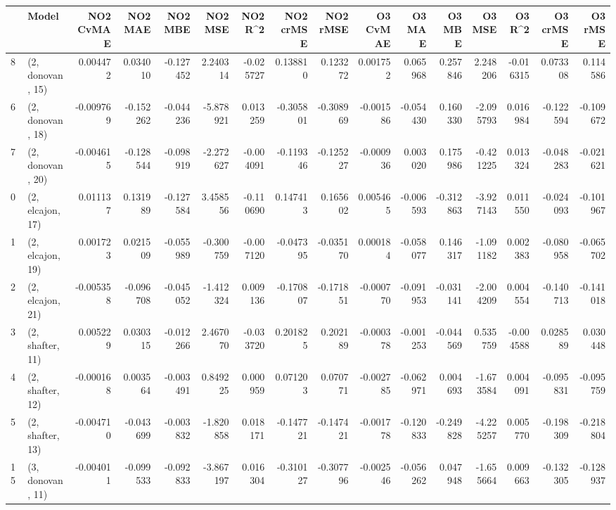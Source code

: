 \begin{tabular}{llrrrrrrrrrrrrrr}
\toprule
{} &             Model &  NO2 CvMAE &   NO2 MAE &   NO2 MBE &    NO2 MSE &   NO2 R\textasciicircum2 &  NO2 crMSE &  NO2 rMSE &  O3 CvMAE &    O3 MAE &    O3 MBE &      O3 MSE &    O3 R\textasciicircum2 &  O3 crMSE &   O3 rMSE \\
\midrule
8  &  (2, donovan, 15) &   0.004472 &  0.034010 & -0.127452 &   2.240314 & -0.025727 &   0.138810 &  0.123272 &  0.001752 &  0.065968 &  0.257846 &    2.248206 & -0.016315 &  0.073308 &  0.114586 \\
6  &  (2, donovan, 18) &  -0.009769 & -0.152262 & -0.044236 &  -5.878921 &  0.013259 &  -0.305801 & -0.308969 & -0.001586 & -0.054430 &  0.160330 &   -2.095793 &  0.016984 & -0.122594 & -0.109672 \\
7  &  (2, donovan, 20) &  -0.004615 & -0.128544 & -0.098919 &  -2.272627 & -0.004091 &  -0.119346 & -0.125227 & -0.000936 &  0.003020 &  0.175986 &   -0.421225 &  0.013324 & -0.048283 & -0.021621 \\
0  &  (2, elcajon, 17) &   0.011137 &  0.131989 & -0.127584 &   3.458556 & -0.110690 &   0.147413 &  0.165602 &  0.005465 & -0.006593 & -0.312863 &   -3.927143 &  0.011550 & -0.024093 & -0.101967 \\
1  &  (2, elcajon, 19) &   0.001723 &  0.021509 & -0.055989 &  -0.300759 & -0.007120 &  -0.047395 & -0.035170 &  0.000184 & -0.058077 &  0.146317 &   -1.091182 &  0.002383 & -0.080958 & -0.065702 \\
2  &  (2, elcajon, 21) &  -0.005358 & -0.096708 & -0.045052 &  -1.412324 &  0.009136 &  -0.170807 & -0.171851 & -0.000770 & -0.091953 & -0.031141 &   -2.004209 &  0.004554 & -0.140713 & -0.141018 \\
3  &  (2, shafter, 11) &   0.005229 &  0.030315 & -0.012266 &   2.467070 & -0.033720 &   0.201825 &  0.202189 & -0.000378 & -0.001253 & -0.044569 &    0.535759 & -0.004588 &  0.028589 &  0.030448 \\
4  &  (2, shafter, 12) &  -0.000168 &  0.003564 & -0.003491 &   0.849225 &  0.000959 &   0.071203 &  0.070771 & -0.002785 & -0.062971 &  0.004693 &   -1.673584 &  0.004091 & -0.095831 & -0.095759 \\
5  &  (2, shafter, 13) &  -0.004710 & -0.043699 & -0.003832 &  -1.820858 &  0.018171 &  -0.147721 & -0.147421 & -0.001778 & -0.120833 & -0.249828 &   -4.225257 &  0.005770 & -0.198309 & -0.218804 \\
15 &  (3, donovan, 11) &  -0.004011 & -0.099533 & -0.092833 &  -3.867197 &  0.016304 &  -0.310127 & -0.307796 & -0.002546 & -0.056262 &  0.047948 &   -1.655664 &  0.009663 & -0.132305 & -0.128937 \\

\end{tabular}
